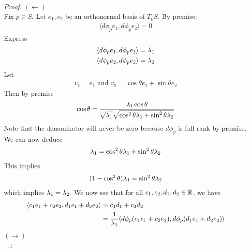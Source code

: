 \documentclass{report}
\begin{document}
\begin{proof}
$(\longleftarrow)$\\

Fix $p \in S$. Let $e_1,e_2$ be an orthonormal basis of  $T_pS$. By premise,  
\begin{align*}
\langle d\phi_p e_1, d\phi_p e_2\rangle = 0
\end{align*}
Express 
\begin{align*}
\langle d\phi_p e_1, d\phi_p e_1\rangle &= \lambda_1\\
\langle d\phi_p e_2, d\phi_p e_2\rangle &=\lambda _2
\end{align*}
Let 
\begin{align*}
v_1=e_1\text{ and }v_2=\cos \theta e_1 +\sin \theta e_2
\end{align*}
Then by premise 
\begin{align*}
\cos \theta = \frac{\lambda _1 \cos \theta}{\sqrt{\lambda _1} \sqrt{\cos^2 \theta \lambda _1 + \sin^2 \theta  \lambda _2}  }
\end{align*}
Note that the denominator will never be zero because $d\phi_p$ is full rank by premise. \\


We can now deduce
\begin{align*}
\lambda _1 = \cos ^2 \theta \lambda _1 + \sin^2 \theta \lambda _2
\end{align*}
This implies 
\begin{align*}
  (1-\cos ^2 \theta)\lambda _1 = \sin^2 \theta \lambda _2
\end{align*}
which implies $\lambda _1 =\lambda _2$. We now see that for all $c_1,c_2,d_1,d_2 \in\mathbb{R}$, we have 
\begin{align*}
\langle c_1e_1+c_2e_2 , d_1e_1+d_2e_2\rangle &= c_1d_1+ c_2d_2\\
&= \frac{1}{\lambda _1} \langle d\phi_p (c_1e_1+c_2e_2), d\phi_p (d_1e_1+d_2e_2)\rangle 
\end{align*}
$(\longrightarrow)$\\


\end{proof}
\end{document}
